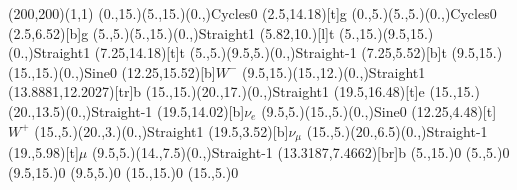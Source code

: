\documentclass[12pt]{article}
\begin{document}
 
 \thispagestyle{empty}
	
 \begin{feynartspicture}(200,200)(1,1) 
 \FADiagram{} 
\FAProp(0.,15.)(5.,15.)(0.,){Cycles}{0}
\FALabel(2.5,14.18)[t]{g}
\FAProp(0.,5.)(5.,5.)(0.,){Cycles}{0}
\FALabel(2.5,6.52)[b]{g}
\FAProp(5.,5.)(5.,15.)(0.,){Straight}{1}
\FALabel(5.82,10.)[l]{t}
\FAProp(5.,15.)(9.5,15.)(0.,){Straight}{1}
\FALabel(7.25,14.18)[t]{t}
\FAProp(5.,5.)(9.5,5.)(0.,){Straight}{-1}
\FALabel(7.25,5.52)[b]{t}
\FAProp(9.5,15.)(15.,15.)(0.,){Sine}{0}
\FALabel(12.25,15.52)[b]{$W^-$}
\FAProp(9.5,15.)(15.,12.)(0.,){Straight}{1}
\FALabel(13.8881,12.2027)[tr]{b}
\FAProp(15.,15.)(20.,17.)(0.,){Straight}{1}
\FALabel(19.5,16.48)[t]{e}
\FAProp(15.,15.)(20.,13.5)(0.,){Straight}{-1}
\FALabel(19.5,14.02)[b]{$\nu_e$}
\FAProp(9.5,5.)(15.,5.)(0.,){Sine}{0}
\FALabel(12.25,4.48)[t]{$W^+$}
\FAProp(15.,5.)(20.,3.)(0.,){Straight}{1}
\FALabel(19.5,3.52)[b]{$\nu_{\mu}$}
\FAProp(15.,5.)(20.,6.5)(0.,){Straight}{-1}
\FALabel(19.,5.98)[t]{$\mu$}
\FAProp(9.5,5.)(14.,7.5)(0.,){Straight}{-1}
\FALabel(13.3187,7.4662)[br]{b}
\FAVert(5.,15.){0}
\FAVert(5.,5.){0}
\FAVert(9.5,15.){0}
\FAVert(9.5,5.){0}
\FAVert(15.,15.){0}
\FAVert(15.,5.){0} 
 \end{feynartspicture} 
 
\end{document}
